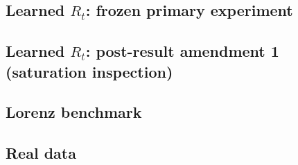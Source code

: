 \documentclass[11pt,a4paper]{article}
\begin{document}
\subsection*{Learned $R_t$: frozen primary experiment}









\subsection*{Learned $R_t$: post-result amendment 1 (saturation inspection)}



\subsection*{Lorenz benchmark}


\subsection*{Real data}



\end{document}
